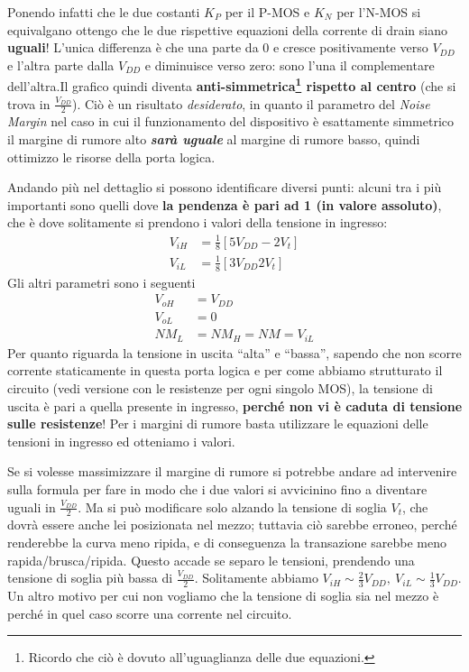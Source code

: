 \documentclass[
]{book}
\begin{document}
Ponendo infatti che le due costanti \(K_{P}\) per il P-MOS e \(K_{N}\)
per l'N-MOS si equivalgano ottengo che le due rispettive equazioni della
corrente di drain siano \textbf{uguali}! L'unica differenza è che una
parte da \(0\) e cresce positivamente verso \(V_{DD}\) e l'altra parte
dalla \(V_{DD}\) e diminuisce verso zero: sono l'una il complementare
dell'altra.\newline Il grafico quindi diventa
\textbf{anti-simmetrica\footnote{Ricordo che ciò è dovuto
  all'uguaglianza delle due equazioni.} rispetto al centro} (che si
trova in \(\frac{V_{DD}}{2}\)). Ciò è un risultato \emph{desiderato}, in
quanto il parametro del \emph{Noise Margin} nel caso in cui il
funzionamento del dispositivo è esattamente simmetrico il margine di
rumore alto \textbf{\emph{sarà uguale}} al margine di rumore basso,
quindi ottimizzo le risorse della porta logica.

Andando più nel dettaglio si possono identificare diversi punti: alcuni
tra i più importanti sono quelli dove \textbf{la pendenza è pari ad 1
(in valore assoluto)}, che è dove solitamente si prendono i valori della
tensione in ingresso: \begin{align*}
V_{iH}&=\frac{1}{8}[5V_{DD}-2V_{t}]\\
V_{iL}&=\frac{1}{8}[3V_{DD}2V_{t}]
\end{align*} Gli altri parametri sono i seguenti \begin{align*}
V_{oH}&=V_{DD}\\V_{oL}&=0\\NM_{L}&=NM_{H}=NM=V_{iL}
\end{align*} Per quanto riguarda la tensione in uscita ``alta'' e
``bassa'', sapendo che non scorre corrente staticamente in questa porta
logica e per come abbiamo strutturato il circuito (vedi versione con le
resistenze per ogni singolo MOS), la tensione di uscita è pari a quella
presente in ingresso, \textbf{perché non vi è caduta di tensione sulle
resistenze}! Per i margini di rumore basta utilizzare le equazioni delle
tensioni in ingresso ed otteniamo i valori.

Se si volesse massimizzare il margine di rumore si potrebbe andare ad
intervenire sulla formula per fare in modo che i due valori si
avvicinino fino a diventare uguali in \(\frac{V_{DD}}{2}\). Ma si può
modificare solo alzando la tensione di soglia \(V_{t}\), che dovrà
essere anche lei posizionata nel mezzo; tuttavia ciò sarebbe erroneo,
perché renderebbe la curva meno ripida, e di conseguenza la transazione
sarebbe meno rapida/brusca/ripida. Questo accade se separo le tensioni,
prendendo una tensione di soglia più bassa di \(\frac{V_{DD}}{2}\).
Solitamente abbiamo
\(V_{iH}\sim\frac{2}{3}V_{DD},\:V_{iL}\sim\frac{1}{3}V_{DD}\). Un altro
motivo per cui non vogliamo che la tensione di soglia sia nel mezzo è
perché in quel caso scorre una corrente nel circuito.
\end{document}
